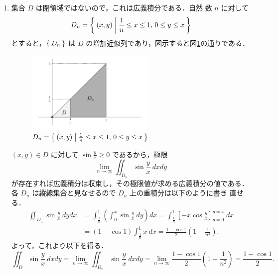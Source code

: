 \documentclass[11pt, uplatex, dvipdfmx]{jsarticle}
\begin{document}
\begin{enumerate}[(1)]
   \item 集合 $D$ は閉領域ではないので，これは広義積分である．自然
     数 $n$ に対して
     \[
       D_n = \Set{ (x,y)  |  \frac{1}{n} \leq x \leq 1, \, 0 \leq y \leq x }
     \]
     とすると，$\Set{D_n}$ は $D$ の増加近似列であり，図示すると図\ref{fig:no23}の通りである．
     \begin{figure}[h]
       \centering
       \includegraphics[height=4cm]{./pictures/no23.pdf}
       \caption{ $D_n=\Set{(x,y) |  \frac{1}{n} \leq x \leq 1, \, 0 \leq y \leq x }$}\label{fig:no23}
     \end{figure}
     
     $(x,y)\in D$ に対して $\sin \frac{y}{x} \geq 0$ であるから，極限
     \[
       \lim_{n \to \infty} \iint_{D_n} \sin \frac{y}{x} \ dx dy
     \]
     が存在すれば広義積分は収束し，その極限値が求める広義積分の値である．
     各 $D_n$ は縦線集合と見なせるので $D_n$ 上の重積分は以下のように書き
     直せる．
     \begin{align*}
       \iint_{D_n} \sin \frac{y}{x} \ dy dx
       &= \int_{\frac{1}{n}}^{1} \left( \int_{0}^{x} \sin \frac{y}{x} \ dy \right) dx
         =\int_{\frac{1}{n}}^{1} \left[-x \cos \frac{y}{x}\right]_{y=0}^{y=x} \ dx\\
       &= (1-\cos 1) \int_{\frac{1}{n}}^{1} x \ dx = \frac{1- \cos 1}{2} \left( 1- \frac{1}{n^2} \right).
     \end{align*}
     よって，これより以下を得る．
     \[
       \iint_D \sin \frac{y}{x} \ dx dy = \lim_{n \to \infty} \iint_{D_n} \sin \frac{y}{x} \ dx dy
       = \lim_{n \to \infty} \frac{1-\cos 1}{2} \left(1-\frac{1}{n^2}\right) = \frac{1-\cos 1}{2}.
     \]


\end{enumerate}
\end{document}
